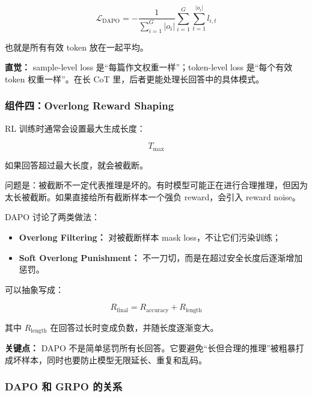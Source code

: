 \[
\mathcal{L}_\text{DAPO}
=
-
\frac{1}{
\sum_{i=1}^{G}|o_i|
}
\sum_{i=1}^{G}
\sum_{t=1}^{|o_i|}
l_{i,t}
\]

也就是所有有效 token 放在一起平均。

\begin{intubox}
\textbf{直觉：} sample-level loss 是“每篇作文权重一样”；token-level loss 是“每个有效 token 权重一样”。在长 CoT 里，后者更能处理长回答中的具体模式。
\end{intubox}

\subsubsection{组件四：Overlong Reward Shaping}

RL 训练时通常会设置最大生成长度：

\[
T_\text{max}
\]

如果回答超过最大长度，就会被截断。

问题是：被截断不一定代表推理是坏的。有时模型可能正在进行合理推理，但因为太长被截断。如果直接给所有截断样本一个强负 reward，会引入 reward noise。

DAPO 讨论了两类做法：

\begin{itemize}[leftmargin=1.5em]
  \item \textbf{Overlong Filtering：} 对被截断样本 mask loss，不让它们污染训练；
  \item \textbf{Soft Overlong Punishment：} 不一刀切，而是在超过安全长度后逐渐增加惩罚。
\end{itemize}

可以抽象写成：

\[
R_\text{final}
=
R_\text{accuracy}
+
R_\text{length}
\]

其中 $R_\text{length}$ 在回答过长时变成负数，并随长度逐渐变大。

\begin{warnbox}
\textbf{关键点：} DAPO 不是简单惩罚所有长回答。它要避免“长但合理的推理”被粗暴打成坏样本，同时也要防止模型无限延长、重复和乱码。
\end{warnbox}

\subsubsection{DAPO 和 GRPO 的关系}

